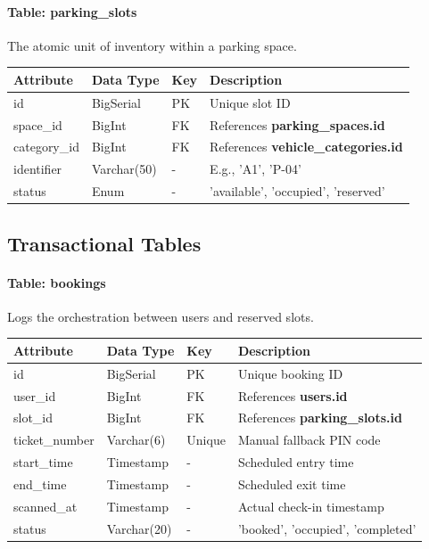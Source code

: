 \paragraph{Table: \textbf{parking\_slots}}
The atomic unit of inventory within a parking space.
\begin{longtable}{|p{3cm}|p{3cm}|p{2cm}|p{6cm}|}
    \hline
    \textbf{Attribute} & \textbf{Data Type} & \textbf{Key} & \textbf{Description} \\
    \hline
    \endhead
    id & BigSerial & PK & Unique slot ID \\
    \hline
    space\_id & BigInt & FK & References \textbf{parking\_spaces.id} \\
    \hline
    category\_id & BigInt & FK & References \textbf{vehicle\_categories.id} \\
    \hline
    identifier & Varchar(50) & - & E.g., 'A1', 'P-04' \\
    \hline
    status & Enum & - & 'available', 'occupied', 'reserved' \\
    \hline
\end{longtable}

\subsection{Transactional Tables}

\paragraph{Table: \textbf{bookings}}
Logs the orchestration between users and reserved slots.
\begin{longtable}{|p{3cm}|p{3cm}|p{2cm}|p{6cm}|}
    \hline
    \textbf{Attribute} & \textbf{Data Type} & \textbf{Key} & \textbf{Description} \\
    \hline
    \endhead
    id & BigSerial & PK & Unique booking ID \\
    \hline
    user\_id & BigInt & FK & References \textbf{users.id} \\
    \hline
    slot\_id & BigInt & FK & References \textbf{parking\_slots.id} \\
    \hline
    ticket\_number & Varchar(6) & Unique & Manual fallback PIN code \\
    \hline
    start\_time & Timestamp & - & Scheduled entry time \\
    \hline
    end\_time & Timestamp & - & Scheduled exit time \\
    \hline
    scanned\_at & Timestamp & - & Actual check-in timestamp \\
    \hline
    status & Varchar(20) & - & 'booked', 'occupied', 'completed' \\
    \hline
\end{longtable}
